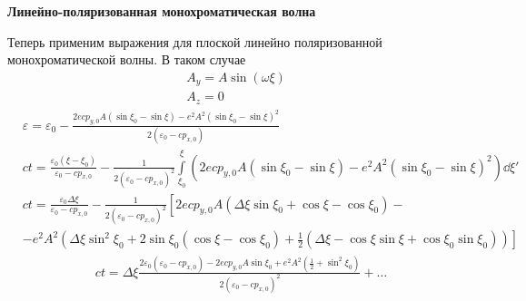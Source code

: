 \documentclass[10pt, a4paper]{article}
\begin{document}
\vspace{5mm}
\textbf{Линейно-поляризованная монохроматическая волна}

Теперь применим выражения для плоской линейно поляризованной монохроматической волны. В таком случае
\begin{align*}
	A_y = A\sin\left( \omega \xi \right) \\
	A_z = 0
\end{align*}
\begin{align*}
	&\varepsilon = \varepsilon_0 - \frac{2ecp_{y,0}A \left( \sin\xi_0 - \sin\xi \right) - e^2 A^2 \left( \sin\xi_0 - \sin\xi \right)^2}{2\left( \varepsilon_0 - cp_{x,0} \right)}\\
	&ct = \frac{\varepsilon_0\left( \xi-\xi_0 \right)}{ \varepsilon_0 - cp_{x,0}}-\frac{1}{2\left( \varepsilon_0 - cp_{x,0} \right)^2}\int\limits_{\xi_0}^{\xi}\left( 2ecp_{y,0}A \left( \sin\xi_0 - \sin\xi \right) - e^2 A^2 \left( \sin\xi_0 - \sin\xi \right)^2  \right)\dd\xi'
\end{align*}
\begin{align*}
	&ct = \frac{\varepsilon_0\Delta\xi}{ \varepsilon_0 - cp_{x,0}}-\frac{1}{2\left( \varepsilon_0 - cp_{x,0} \right)^2}\left[ 2ecp_{y,0}A\left( \Delta\xi\sin\xi_0 + \cos\xi - \cos\xi_0 \right) - \right. \\
	&\left. - e^2A^2\left( \Delta\xi\sin^2\xi_0 + 2\sin\xi_0 \left( \cos\xi - \cos\xi_0 \right) + \frac{1}{2}\left( \Delta\xi - \cos\xi\sin\xi + \cos\xi_0\sin\xi_0 \right) \right) \right]
\end{align*}
\begin{align*}
	&ct = \Delta\xi \frac{2\varepsilon_0\left( \varepsilon_0 - cp_{x,0} \right) - 2ecp_{y,0}A \sin\xi_0 + e^2A^2\left( \frac{1}{2} + \sin^2\xi_0  \right)}{2\left( \varepsilon_0 - cp_{x,0} \right)^2} + \dots
\end{align*}
\end{document}
